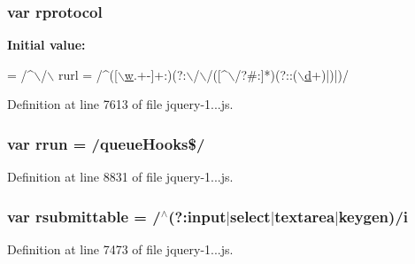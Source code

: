 \subsubsection[{rprotocol}]{\setlength{\rightskip}{0pt plus 5cm}var rprotocol}\label{_scripts_2jquery-1_810_82_8js_a0f02b710647fcf95e74593954fb9b4cb}
{\bfseries Initial value\+:}
\begin{DoxyCode}
= /^\(\backslash\)/\(\backslash\)
    rurl = /^([\hyperlink{obj_2_release_2_package_2_package_tmp_2_scripts_2respond_8min_8js_a9721a992655f700bdc2e91ba68b71e26}{\(\backslash\)w}.+-]+:)(?:\(\backslash\)/\(\backslash\)/([^\(\backslash\)/?#:]*)(?::(\hyperlink{obj_2_release_2_package_2_package_tmp_2_scripts_2bootstrap_8min_8js_aeb337d295abaddb5ec3cb34cc2e2bbc9}{\(\backslash\)d}+)|)|)/
\end{DoxyCode}


Definition at line 7613 of file jquery-\/1...\+js.

\hypertarget{_scripts_2jquery-1_810_82_8js_acf9d5e6b315eca81eb432bb6ee280a2e}{}
\subsubsection[{rrun}]{\setlength{\rightskip}{0pt plus 5cm}var rrun = /queue\+Hooks\$/}\label{_scripts_2jquery-1_810_82_8js_acf9d5e6b315eca81eb432bb6ee280a2e}


Definition at line 8831 of file jquery-\/1...\+js.

\hypertarget{_scripts_2jquery-1_810_82_8js_a12d248d7e6c5985c5ea21f56fbef9e90}{}
\subsubsection[{rsubmittable}]{\setlength{\rightskip}{0pt plus 5cm}var rsubmittable = /$^\wedge$(?\+:{\bf input}$\vert$select$\vert$textarea$\vert$keygen)/{\bf i}}\label{_scripts_2jquery-1_810_82_8js_a12d248d7e6c5985c5ea21f56fbef9e90}


Definition at line 7473 of file jquery-\/1...\+js.

\hypertarget{_scripts_2jquery-1_810_82_8js_a0e9cd4ca08945afe827846f34a36c74a}{}
